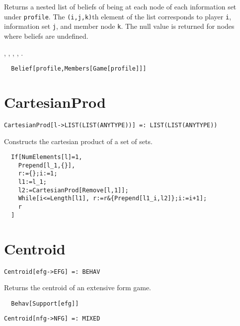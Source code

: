 \noindent
Returns a nested list of beliefs of being at each node of each
information set under \verb+profile+. The \verb+(i,j,k)+th element of
the list corresponds to player \verb+i+, information set \verb+j+, and
member node \verb+k+. The null value is returned for nodes where
beliefs are undefined.

\seealso {},
,
,
,
.

\udfbody
\begin{verbatim}
  Belief[profile,Members[Game[profile]]]
\end{verbatim}


\section*{CartesianProd}\label{ExtCartesianProd}
\begin{verbatim}
CartesianProd[l->LIST(LIST(ANYTYPE))] =: LIST(LIST(ANYTYPE)) 
\end{verbatim}

\noindent
Constructs the cartesian product of a set of sets.  

\udfbody
\begin{verbatim}
  If[NumElements[l]=1,
    Prepend[l_1,{}],
    r:={};i:=1;
    l1:=l_1;
    l2:=CartesianProd[Remove[l,1]];
    While[i<=Length[l1], r:=r&{Prepend[l1_i,l2]};i:=i+1];
    r
  ]
\end{verbatim}


\section*{Centroid}\label{ExtCentroid}
\begin{verbatim}
Centroid[efg->EFG] =: BEHAV 
\end{verbatim}

\noindent
Returns the centroid of an extensive form game.  

\udfbody
\begin{verbatim}
  Behav[Support[efg]]
\end{verbatim} 

\newsignature

\begin{verbatim}
Centroid[nfg->NFG] =: MIXED 
\end{verbatim}

